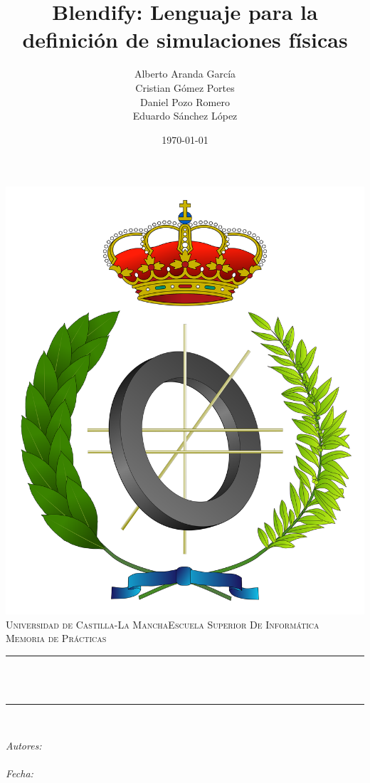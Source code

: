 \documentclass[12pt]{article}
\title{Blendify: Lenguaje para la definición de simulaciones físicas}			%
\author{Alberto Aranda García \\ Cristian Gómez Portes \\ Daniel Pozo Romero \\ Eduardo Sánchez López}				%
\date{\today}				%
\makeatletter
\let\thetitle\@title
\let\theauthor\@author
\let\thedate\@date
\makeatother
\begin{document}

\begin{titlepage}
	\centering
    \vspace*{0.5 cm}
    \includegraphics[scale = 0.1]{informatica.png}\\[1.0 cm]										%
    \textsc{\LARGE Universidad de Castilla-La Mancha\newline\newline Escuela Superior De Informática}\\[2.0 cm]		%
	\textsc{\Large Memoria de Prácticas}\\[0.5 cm]												%
	\rule{\linewidth}{0.2 mm} \\[0.4 cm]
	{ \huge \bfseries \thetitle}\\
	\rule{\linewidth}{0.2 mm} \\[1.5 cm]
	
	\begin{minipage}{0.4\textwidth}
		\begin{center} \large
			\emph{Autores:}\\
			\theauthor\\
			\vspace*{1 cm}
			\emph{Fecha:}\\
			\thedate\\
			\end{center}
        
	\end{minipage}\\[2 cm]
	
\end{titlepage}
\end{document}
